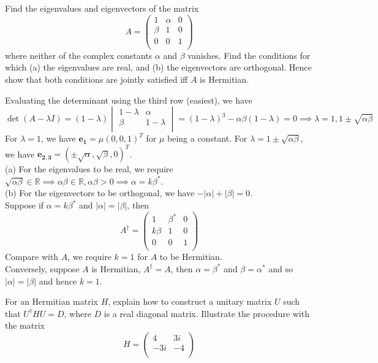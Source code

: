 \documentclass[a4paper]{article}
\begin{document}
\begin{qns}[Hermitian]
Find the eigenvalues and eigenvectors of the matrix
$$A=\begin{pmatrix}1&\alpha&0\\\beta&1&0\\0&0&1\\\end{pmatrix}$$
where neither of the complex constants $\alpha$ and $\beta$ vanishes. Find the conditions for
which (a) the eigenvalues are real, and (b) the eigenvectors are orthogonal. Hence show that both conditions are jointly satisfied iff $A$ is Hermitian.
\end{qns}
\newpage
\begin{ans}
Evaluating the determinant using the third row (easiest), we have $$\det(A-\lambda I)=(1-\lambda)\begin{vmatrix}1-\lambda&\alpha\\\beta&1-\lambda\\\end{vmatrix}=(1-\lambda)^3-\alpha\beta(1-\lambda)=0\implies\lambda=1,1\pm\sqrt{\alpha\beta}$$
For $\lambda=1$, we have $\mathbf{e_1}=\mu(0,0,1)^T$ for $\mu$ being a constant. For $\lambda=1\pm\sqrt{\alpha\beta}$, we have $\mathbf{e_{2,3}}=(\pm\sqrt{\alpha},\sqrt{\beta},0)^T$.\\[5pt]
(a) For the eigenvalues to be real, we require $\sqrt{\alpha\beta}\in\mathbb{R}\implies\alpha\beta\in\mathbb{R},\alpha\beta>0\implies\alpha=k\beta^*$.\\[5pt]
(b) For the eigenvectors to be orthogonal, we have $-|\alpha|+|\beta|=0$.\\[5pt]
Suppose if $\alpha=k\beta^*$ and $|\alpha|=|\beta|$, then
$$A^\dag=\begin{pmatrix}1&\beta^*&0\\ k\beta&1&0\\0&0&1\\\end{pmatrix}$$
Compare with $A$, we require $k=1$ for $A$ to be Hermitian.\\[5pt]
Conversely, suppose $A$ is Hermitian, $A^\dag=A$, then $\alpha=\beta^*$ and $\beta=\alpha^*$ and so $|\alpha|=|\beta|$ and hence $k=1$.
\end{ans}
\begin{qns}[Hermitian]
For an Hermitian matrix $H$, explain how to construct a unitary matrix $U$ such that $U^\dag HU=D$, where $D$ is a real diagonal matrix. Illustrate the procedure with the matrix
$$H=\begin{pmatrix}4&3i\\-3i&-4\\\end{pmatrix}$$
\end{qns}
\end{document}
